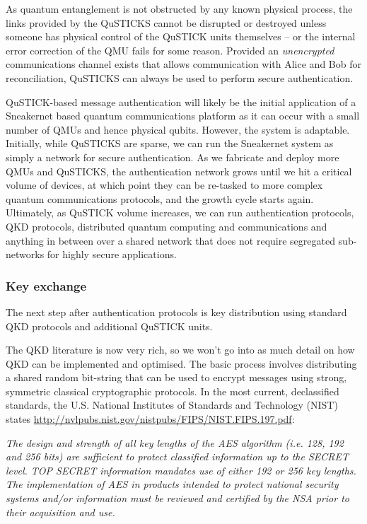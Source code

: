 \documentclass[twocolumn, aps, rmp, amsmath, amssymb, nofootinbib, superscriptaddress, longbibliography, floatfix, table-of-contents, eqsecnum]{revtex4-2}
\begin{document}
As quantum entanglement is not obstructed by any known physical process, the links provided by the QuSTICKS cannot be disrupted or destroyed unless someone has physical control of the QuSTICK units themselves -- or the internal error correction of the QMU fails for some reason. Provided an {\em unencrypted} communications channel exists that allows communication with Alice and Bob for reconciliation, QuSTICKS can always be used to perform secure authentication. 

QuSTICK-based message authentication will likely be the initial application of a Sneakernet based quantum communications platform as it can occur with a small number of QMUs and hence physical qubits. However, the system is adaptable. Initially, while QuSTICKS are sparse, we can run the Sneakernet system as simply a network for secure authentication. As we fabricate and deploy more QMUs and QuSTICKS, the authentication network grows until we hit a critical volume of devices, at which point they can be re-tasked to more complex quantum communications protocols, and the growth cycle starts again. Ultimately, as QuSTICK volume increases, we can run authentication protocols, QKD protocols, distributed quantum computing and communications and anything in between over a shared network that does not require segregated sub-networks for highly secure applications. 

\subsubsection{Key exchange}

The next step after authentication protocols is key distribution using standard QKD protocols and additional QuSTICK units. 

The QKD literature is now very rich, so we won't go into as much detail on how QKD can be implemented and optimised. The basic process involves distributing a shared random bit-string that can be used to encrypt messages using strong, symmetric classical cryptographic protocols. In the most current, declassified standards, the U.S. National Institutes of Standards and Technology (NIST) states \href{http://nvlpubs.nist.gov/nistpubs/FIPS/NIST.FIPS.197.pdf}{http://nvlpubs.nist.gov/nistpubs/FIPS/NIST.FIPS.197.pdf}:

{\em The design and strength of all key lengths of the AES algorithm (i.e. 128, 192 and 256 bits) are sufficient to protect classified information up to the \textsc{SECRET} level. \textsc{TOP SECRET} information mandates use of either 192 or 256 key lengths. The implementation of AES in products intended to protect national security systems and/or information must be reviewed and certified by the NSA prior to their acquisition and use.}
\end{document}

